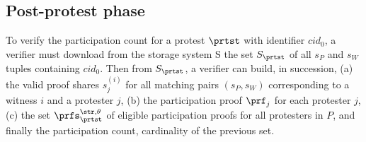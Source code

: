 \normalsize


\subsection{Post-protest phase}%
\label{ProtocolVerification}



To verify the participation count for a protest \(\prtst\) with identifier \(cid_0\),
a verifier must download from the storage system S the set \(S_{\prtst}\) of all \(s_P\) and \(s_W\) tuples containing \(cid_0\).
Then from \(S_{\prtst}\), a verifier can build, in succession,
(a) the valid proof shares \(s_j^{(i)}\) for all matching pairs \((s_P,s_W)\) corresponding to a witness  \(i\) and a protester \(j\),
(b) the participation proof \(\prf_{j}\) for each protester \(j\),
(c) the set \(\prfs_{\prtst}^{\str,\theta}\) of eligible participation proofs for all protesters in \(P\),
 and finally the participation count, cardinality of the previous set.


